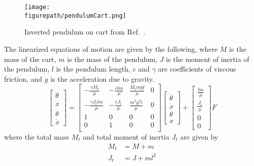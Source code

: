 \begin{figure}[H]
  \begin{center}
    \texttt{[image: \\figurepath/pendulumCart.png]}
    \vspace{-0.1in}
    \caption{Inverted pendulum on cart from Ref.\ \cite{astrom.feedbackintro.2010}.\label{fig.pendulumCart}}
  \end{center}
\end{figure}

The linearized equations of motion are given by the following, where $M$ is the mass of the cart, $m$ is the mass of the pendulum, $J$ is the moment of inertia of the pendulum, $l$ is the pendulum length, $c$ and $\gamma$ are coefficients of viscous friction, and $g$ is the acceleration due to gravity.
\begin{equation}
  \label{eqn.pendulumCartWhole}
  \begin{bmatrix}
    \ddot{\theta} \\
    \ddot{x} \\
    \dot{\theta} \\
    \dot{x}
  \end{bmatrix}
  =
  \begin{bmatrix}
    -\frac{\gamma M_{t}}{\mu} & -\frac{cl m}{\mu} & \frac{M_{t}mgl}{\mu} & 0 \\
    -\frac{\gamma J_{t}l m}{\mu} & -\frac{cJ_{t}}{\mu} & \frac{m^{2}g^{2}l}{\mu} & 0 \\
    1 & 0 & 0 & 0 \\
    0 & 1 & 0 & 0 \\
  \end{bmatrix}
  \begin{bmatrix}
    \dot{\theta} \\
    \dot{x} \\
    \theta \\
    x
  \end{bmatrix}
  +
  \begin{bmatrix}
    \frac{l m}{\mu} \\
    \frac{J_{t}}{\mu} \\
    0 \\
    0
  \end{bmatrix}
  F
\end{equation}
where the total mass $M_{t}$ and total moment of inertia $J_{t}$ are given by
\begin{equation*}
  \begin{aligned}
    M_{t} & = M + m \\
    J_{t} &= J + ml^{2}
  \end{aligned}
\end{equation*}
